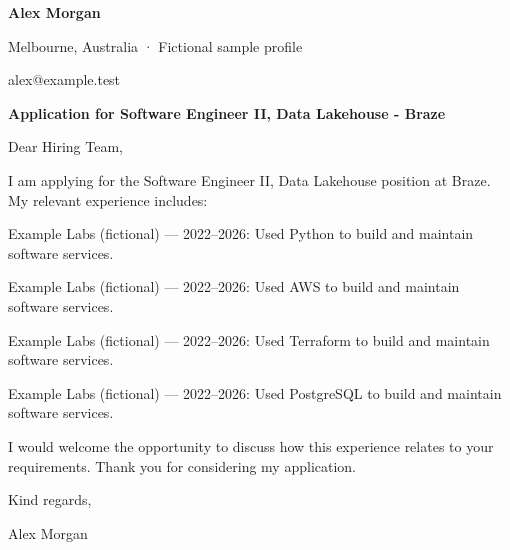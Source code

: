 \documentclass[10pt,a4paper]{article}
\begin{document}
{\LARGE\bfseries\color{navy} Alex Morgan}\par
Melbourne, Australia · Fictional sample profile\par
alex@example.test\par
{\large\bfseries\color{navy} Application for Software Engineer II, Data Lakehouse - Braze}\par
Dear Hiring Team,\par
I am applying for the Software Engineer II, Data Lakehouse position at Braze. My relevant experience includes:\par
Example Labs (fictional) — 2022–2026: Used Python to build and maintain software services.\par
Example Labs (fictional) — 2022–2026: Used AWS to build and maintain software services.\par
Example Labs (fictional) — 2022–2026: Used Terraform to build and maintain software services.\par
Example Labs (fictional) — 2022–2026: Used PostgreSQL to build and maintain software services.\par
I would welcome the opportunity to discuss how this experience relates to your requirements. Thank you for considering my application.\par
Kind regards,\par
Alex Morgan\par
\end{document}
